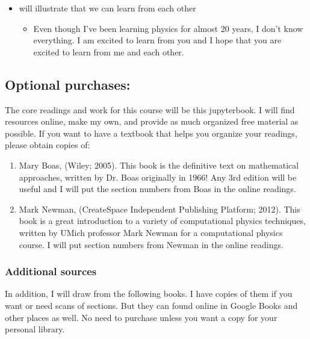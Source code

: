 \documentclass[letterpaper,10pt,english]{jupyterBook}
\begin{document}
\begin{itemize}
\begin{itemize}
\end{itemize}

\item {} 
 will illustrate that we can learn from each other
\begin{itemize}
\item {} 
\sphinxAtStartPar
Even though I’ve been learning physics for almost 20 years, I don’t know everything. I am excited to learn from you and I hope that you are excited to learn from me and each other.

\end{itemize}

\end{itemize}


\subsection{Optional purchases:}
\label{\detokenize{content/0_course/2_design:optional-purchases}}
\sphinxAtStartPar
The core readings and work for this course will be this jupyterbook. I will find resources online, make my own, and provide as much organized free material as possible. If you want to have a textbook that helps you organize your readings, please obtain copies of:
\begin{enumerate}
%
\item {} 
\sphinxAtStartPar
Mary Boas,  (Wiley; 2005). This book is the definitive text on mathematical approaches, written by Dr. Boas originally in 1966! Any 3rd edition will be useful and I will put the section numbers from Boas in the online readings.

\item {} 
\sphinxAtStartPar
Mark Newman,  (CreateSpace Independent Publishing Platform; 2012). This book is a great introduction to a variety of computational physics techniques, written by UMich professor Mark Newman for a computational physics course. I will put section numbers from Newman in the online readings.

\end{enumerate}


\subsubsection{Additional sources}
\label{\detokenize{content/0_course/2_design:additional-sources}}
\sphinxAtStartPar
In addition, I will draw from the following books. I have copies of them if you want or need scans of sections. But they can found online in Google Books and other places as well. No need to purchase unless you want a copy for your personal library.
\end{document}

